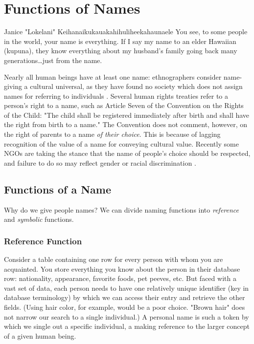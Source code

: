 \section{Functions of Names}

\begin{aquote}{Janice "Lokelani" Keihanaikukauakahihuliheekahaunaele
	\parencite{lee-valley}}
	You see, to some people in the world, your name is everything. If I say my
	name to an elder Hawaiian (kupuna), they know everything about my husband's
	family going back many generations…just from the name.
\end{aquote}

Nearly all human beings have at least one name: ethnographers consider
name-giving a cultural universal, as they have found no society which does not
assign names for referring to individuals \parencite{alford88}. Several human
rights treaties refer to a person's right to a name, such as Article Seven of
the Convention on the Rights of the Child: "The child shall be registered
immediately after birth and shall have the right from birth to a name."
\parencite{crc} The Convention does not comment, however, on the right of
parents to a name \textit{of their choice}. This is because of lagging
recognition of the value of a name for conveying cultural value. Recently some
NGOs are taking the stance that the name of people's choice should be respected,
and failure to do so may reflect gender or racial discrimination
\parencite[986]{varennes15}.

\subsection{Functions of a Name}

Why do we give people names? We can divide naming functions into
\textit{reference} and \textit{symbolic} functions.

\subsubsection{Reference Function}

Consider a table containing one row for every person with whom you are
acquainted. You store everything you know about the person in their database
row: nationality, appearance, favorite foods, pet peeves, etc. But faced with a
vast set of data, each person needs to have one relatively unique identifier
(key in database terminology) by which we can access their entry and retrieve
the other fields. (Using hair color, for example, would be a poor choice. "Brown
hair" does not narrow our search to a single individual.) A personal name is
such a token by which we single out a specific individual, a making reference to
the larger concept of a given human being.


